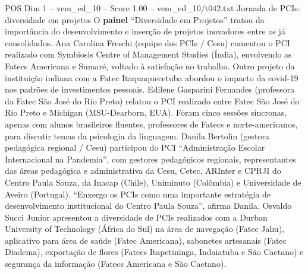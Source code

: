 \begin{textsample}{POS Dim 1 – vem\_ed\_10 – Score 1.00 – vem\_ed\_10/t042.txt}  \label{ex:f1_pos_023}
Jornada de PCIs: diversidade em projetos O \textbf{painel} “Diversidade em Projetos” tratou da importância do desenvolvimento e inserção de projetos inovadores entre os já consolidados.
Ana Carolina Freschi (equipe dos PCIs / Cesu) comentou o PCI realizado com Symbiosis Centre of Management Studies (Índia), envolvendo as Fatecs Americana e Sumaré, voltado à satisfação no trabalho.
Outro projeto da instituição indiana com a Fatec Itaquaquecetuba abordou o impacto da covid-19 nos padrões de investimentos pessoais.
Edilene Gasparini Fernandes (professora da Fatec São José do Rio Preto) relatou o PCI realizado entre Fatec São José do Rio Preto e Michigan (MSU-Dearborn, EUA).
Foram cinco sessões síncronas, apenas com alunos brasileiros fluentes, professores de Fatecs e norte-americanos, para discutir temas da psicologia da linguagem.
Danila Bertolin (gestora pedagógica regional / Cesu) participou do PCI “Administração Escolar Internacional na Pandemia”, com gestores pedagógicos regionais, representantes das áreas pedagógica e administrativa da Cesu, Cetec, ARInter e CPRJI do Centro Paula Souza, da Inacap (Chile), Uniminuto (Colômbia) e Universidade de Aveiro (Portugal). “Enxergo os PCIs como uma importante estratégia de desenvolvimento institucional do Centro Paula Souza”, afirma Danila.
Osvaldo Succi Junior apresentou a diversidade de PCIs realizados com a Durban University of Technology (África do Sul) na área de navegação (Fatec Jahu), aplicativo para área de saúde (Fatec Americana), sabonetes artesanais (Fatec Diadema), exportação de flores (Fatecs Itapetininga, Indaiatuba e São Caetano) e segurança da informação (Fatecs Americana e São Caetano).

\end{textsample}
